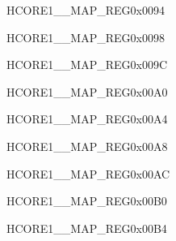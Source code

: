 \begin{register}{H}{CORE1\_\_MAP\_REG}{0x0094}\label{regdesc:CORE1ADCINTMAPREG}
\end{register}\vspace{-3em}


\begin{register}{H}{CORE1\_\_MAP\_REG}{0x0098}\label{regdesc:CORE1PWM0INTMAPREG}
\end{register}\vspace{-3em}


\begin{register}{H}{CORE1\_\_MAP\_REG}{0x009C}\label{regdesc:CORE1PWM1INTMAPREG}
\end{register}\vspace{-3em}


\begin{register}{H}{CORE1\_\_MAP\_REG}{0x00A0}\label{regdesc:CORE1TWAI0INTMAPREG}
\end{register}\vspace{-3em}


\begin{register}{H}{CORE1\_\_MAP\_REG}{0x00A4}\label{regdesc:CORE1TWAI1INTMAPREG}
\end{register}\vspace{-3em}


\begin{register}{H}{CORE1\_\_MAP\_REG}{0x00A8}\label{regdesc:CORE1TWAI2INTMAPREG}
\end{register}\vspace{-3em}


\begin{register}{H}{CORE1\_\_MAP\_REG}{0x00AC}\label{regdesc:CORE1RMTINTMAPREG}
\end{register}\vspace{-3em}


\begin{register}{H}{CORE1\_\_MAP\_REG}{0x00B0}\label{regdesc:CORE1I2C0INTMAPREG}
\end{register}\vspace{-3em}


\begin{register}{H}{CORE1\_\_MAP\_REG}{0x00B4}\label{regdesc:CORE1I2C1INTMAPREG}
\end{register}\vspace{-3em}


